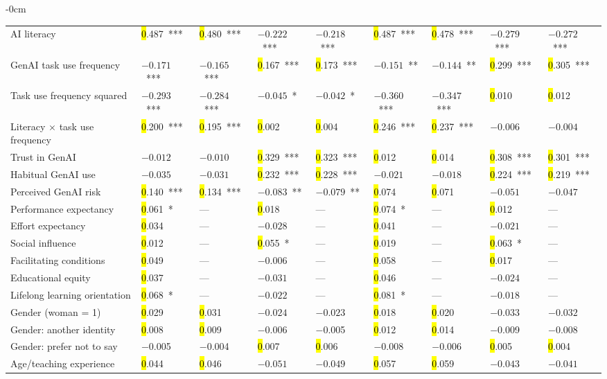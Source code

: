 \documentclass[sustainability,article,accept,moreauthors]{Definitions/mdpi}
\begin{document}
\begin{table}[H]
\begin{adjustwidth}{-\extralength}{0cm}
\begin{tabular}{p{4cm}*{8}{p{1.5cm}}}
AI literacy &\hl{0}.487~*** &\hl{0}.480~*** & $-0.222$~*** & $-0.218$~*** &\hl{0}.487~*** &\hl{0}.478~*** & $-0.279$~*** & $-0.272$~***\\
GenAI task use frequency & $-0.171$~*** & $-0.165$~*** &\hl{0}.167~*** &\hl{0}.173~*** & $-0.151$~** & $-0.144$~** &\hl{0}.299~*** &\hl{0}.305~***\\
Task use frequency squared & $-0.293$~*** & $-0.284$~*** & $-0.045$~* & $-0.042$~* & $-0.360$~*** & $-0.347$~*** &\hl{0}.010 &\hl{0}.012\\
Literacy $\times$ task use frequency &\hl{0}.200~*** &\hl{0}.195~*** &\hl{0}.002 &\hl{0}.004 &\hl{0}.246~*** &\hl{0}.237~*** & $-0.006$ & $-0.004$\\
Trust in GenAI & $-0.012$ & $-0.010$ &\hl{0}.329~*** &\hl{0}.323~*** &\hl{0}.012 &\hl{0}.014 &\hl{0}.308~*** &\hl{0}.301~***\\
Habitual GenAI use & $-0.035$ & $-0.031$ &\hl{0}.232~*** &\hl{0}.228~*** & $-0.021$ & $-0.018$ &\hl{0}.224~*** &\hl{0}.219~***\\
Perceived GenAI risk &\hl{0}.140~*** &\hl{0}.134~*** & $-0.083$~** & $-0.079$~** &\hl{0}.074 &\hl{0}.071 & $-0.051$ & $-0.047$\\
Performance expectancy &\hl{0}.061~* & --- &\hl{0}.018 & --- &\hl{0}.074~* & --- &\hl{0}.012 & ---\\
Effort expectancy &\hl{0}.034 & --- & $-0.028$ & --- &\hl{0}.041 & --- & $-0.021$ & ---\\
Social influence &\hl{0}.012 & --- &\hl{0}.055~* & --- &\hl{0}.019 & --- &\hl{0}.063~* & ---\\
Facilitating conditions &\hl{0}.049 & --- & $-0.006$ & --- &\hl{0}.058 & --- &\hl{0}.017 & ---\\
Educational equity &\hl{0}.037 & --- & $-0.031$ & --- &\hl{0}.046 & --- & $-0.024$ & ---\\
Lifelong learning orientation &\hl{0}.068~* & --- & $-0.022$ & --- &\hl{0}.081~* & --- & $-0.018$ & ---\\




Gender (woman = 1) &\hl{0}.029 &\hl{0}.031 & $-0.024$ & $-0.023$ &\hl{0}.018 &\hl{0}.020 & $-0.033$ & $-0.032$\\
Gender: another identity &\hl{0}.008 &\hl{0}.009 & $-$0.006 & $-$0.005 &\hl{0}.012 &\hl{0}.014 & $-$0.009 & $-$0.008\\
Gender: prefer not to say & $-$0.005 & $-$0.004 &\hl{0}.007 &\hl{0}.006 & $-$0.008 & $-$0.006 &\hl{0}.005 &\hl{0}.004\\
Age/teaching experience &\hl{0}.044 &\hl{0}.046 & $-0.051$ & $-0.049$ &\hl{0}.057 &\hl{0}.059 & $-0.043$ & $-0.041$\\



\end{tabular}
\end{adjustwidth}
\end{table}
\end{document}
